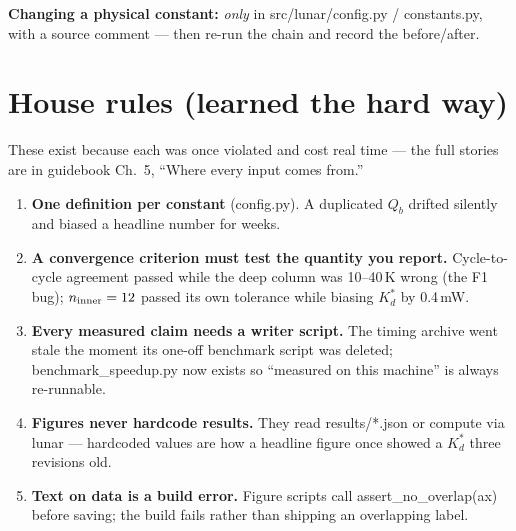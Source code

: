 \documentclass[11pt]{article}
\newcommand{\code}[1]{{\ttfamily\small #1}}
\begin{document}
\noindent\textbf{Changing a physical constant:} \emph{only} in
\code{src/lunar/config.py} / \code{constants.py}, with a source comment ---
then re-run the chain and record the before/after.

\section{House rules (learned the hard way)}

These exist because each was once violated and cost real time --- the full
stories are in guidebook Ch.~5, ``Where every input comes from.''

\begin{housebox}
\begin{enumerate}[leftmargin=1.6em, itemsep=5pt]
\item \textbf{One definition per constant} (\code{config.py}). A duplicated
  $Q_b$ drifted silently and biased a headline number for weeks.
\item \textbf{A convergence criterion must test the quantity you report.}
  Cycle-to-cycle agreement passed while the deep column was 10--40\,K wrong
  (the F1 bug); $n_{\rm inner}=12$ passed its own tolerance while biasing
  $K_d^{*}$ by 0.4\,mW.
\item \textbf{Every measured claim needs a writer script.} The timing archive
  went stale the moment its one-off benchmark script was deleted;
  \code{benchmark\_speedup.py} now exists so ``measured on this machine'' is
  always re-runnable.
\item \textbf{Figures never hardcode results.} They read \code{results/*.json}
  or compute via \code{lunar} --- hardcoded values are how a headline figure
  once showed a $K_d^{*}$ three revisions old.
\item \textbf{Text on data is a build error.} Figure scripts call
  \code{assert\_no\_overlap(ax)} before saving; the build fails rather than
  shipping an overlapping label.
\end{enumerate}
\end{housebox}
\end{document}
